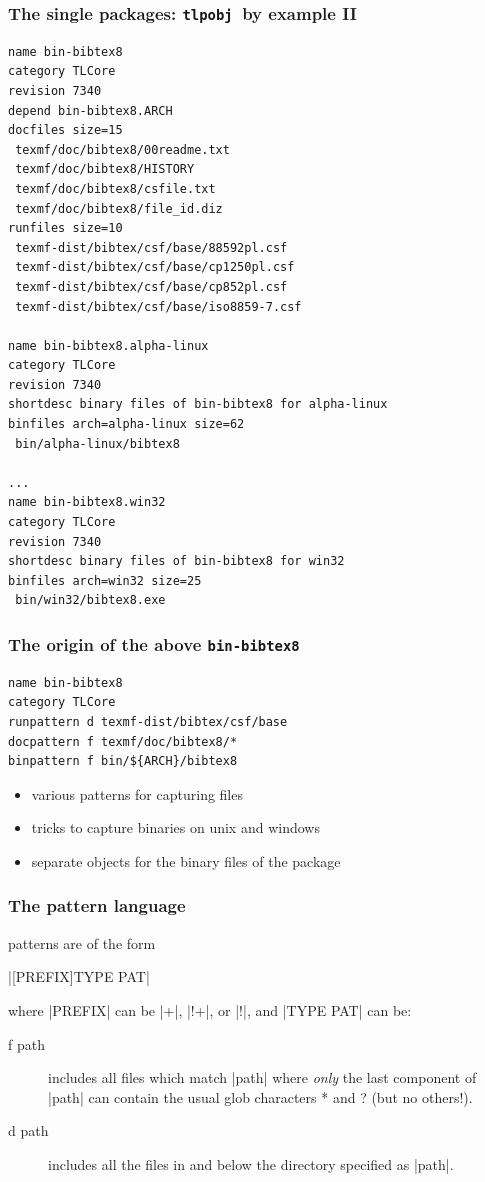 \documentclass{beamer}
\newcommand{\tlpobj}{\texttt{tlpobj}}
\begin{document}
\begin{frame}
  \frametitle{The single packages: \tlpobj\ by example II}
  \begin{lstlisting}[basicstyle=\ttfamily\tiny,title={bin-bibtex8 and friends},label=bibtex8]
name bin-bibtex8
category TLCore
revision 7340
depend bin-bibtex8.ARCH
docfiles size=15
 texmf/doc/bibtex8/00readme.txt
 texmf/doc/bibtex8/HISTORY
 texmf/doc/bibtex8/csfile.txt
 texmf/doc/bibtex8/file_id.diz
runfiles size=10
 texmf-dist/bibtex/csf/base/88592pl.csf
 texmf-dist/bibtex/csf/base/cp1250pl.csf
 texmf-dist/bibtex/csf/base/cp852pl.csf
 texmf-dist/bibtex/csf/base/iso8859-7.csf

name bin-bibtex8.alpha-linux
category TLCore
revision 7340
shortdesc binary files of bin-bibtex8 for alpha-linux
binfiles arch=alpha-linux size=62
 bin/alpha-linux/bibtex8

...
name bin-bibtex8.win32
category TLCore
revision 7340
shortdesc binary files of bin-bibtex8 for win32
binfiles arch=win32 size=25
 bin/win32/bibtex8.exe
\end{lstlisting}
\end{frame}

\begin{frame}[fragile]
  \frametitle{The origin of the above \texttt{bin-bibtex8}}
  \begin{lstlisting}[basicstyle=\ttfamily\small,title={bin-bibtex8.tlpsrc},label=bin-dvipsk.tlpsrc]
name bin-bibtex8
category TLCore
runpattern d texmf-dist/bibtex/csf/base
docpattern f texmf/doc/bibtex8/*
binpattern f bin/${ARCH}/bibtex8
\end{lstlisting} %
  \begin{itemize}
  \item various patterns for capturing files
  \item tricks to capture binaries on unix and windows
  \item separate objects for the binary files of the package
  \end{itemize}
\end{frame}

\begin{frame}[fragile]
  \frametitle{The pattern language}
  patterns are of the form
  \begin{center}
    |[PREFIX]TYPE PAT|
  \end{center}
  where |PREFIX| can be |+|, |!+|, or |!|, \pause and |TYPE PAT| can be:
  \begin{description}
  \item[f path]
    includes all files which match |path| where \emph{only} the last
    component of |path| can contain the usual glob characters * and ?
    (but no others!).\pause
  \item[d path]
    includes all the files in and below the directory specified as
    |path|.
  \end{description}
\end{frame}
\end{document}
